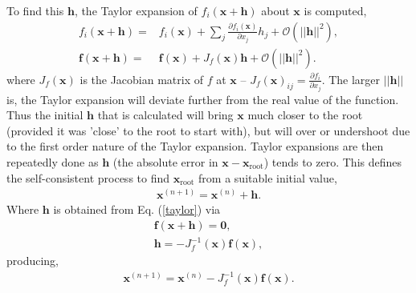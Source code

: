 To find this $\textbf{h}$, the Taylor expansion of $f_i(\textbf{x}+\textbf{h})$ about $\textbf{x}$ is computed,
\begin{align}
f_i(\textbf{x}+\textbf{h}) =& f_i(\textbf{x}) + \sum_j \frac{\partial f_i( \textbf{x})}{\partial x_j} h_j + \mathcal{O}(||\textbf{h}||^2), \\ \label{taylor}
\textbf{f}(\textbf{x}+\textbf{h}) =& \textbf{f}(\textbf{x}) + J_f(\textbf{x}) \textbf{h} + \mathcal{O}(||\textbf{h}||^2).
\end{align}
where $J_f(\textbf{x})$ is the Jacobian matrix of $f$ at $\textbf{x}$ -- $J_f(\textbf{x})_{ij} = \frac{\partial f_i}{\partial x_j}$. The larger $||\textbf{h}||$ is, the Taylor expansion will deviate further from the real value of the function. Thus the initial $\textbf{h}$ that is calculated will bring $\textbf{x}$ much closer to the root (provided it was 'close' to the root to start with), but will over or undershoot due to the first order nature of the Taylor expansion. Taylor expansions are then repeatedly done as $\textbf{h}$ (the absolute error in $\textbf{x} - \textbf{x}_{\text{root}}$) tends to zero. This defines the self-consistent process to find  $\textbf{x}_{\text{root}}$ from a suitable initial value,
\begin{align}
\textbf{x}^{(n+1)} = \textbf{x}^{(n)} + \textbf{h}.
\end{align} 
Where $\textbf{h}$ is obtained from Eq$.$ (\ref{taylor}) via
\begin{align}
\textbf{f}(\textbf{x}+\textbf{h}) = \textbf{0},\\
\textbf{h} = -J^{-1}_f(\textbf{x})\textbf{f}(\textbf{x}),
\end{align}  
producing,
\begin{align}
\textbf{x}^{(n+1)} = \textbf{x}^{(n)} -J^{-1}_f(\textbf{x})\textbf{f}(\textbf{x}).
\end{align}
